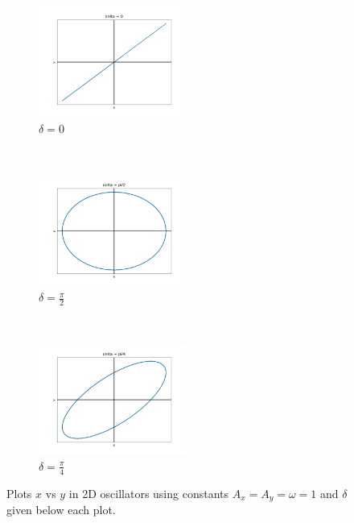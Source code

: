 \begin{figure}[h]
    \centering
    \begin{subfigure}[t]{0.3\textwidth}
        \centering
        \includegraphics[width=4.85cm]{Classical_Mechanics/2.11-2d-osc/Osc2D_delta0.png}
        \caption{$\delta = 0$}
    \end{subfigure}
    ~ 
    \begin{subfigure}[t]{0.3\textwidth}
        \centering
        \includegraphics[width=4.85cm]{Classical_Mechanics/2.11-2d-osc/Osc2D_deltapi2.png}
        \caption{$\delta = \frac{\pi}{2}$}
    \end{subfigure}
    ~
    \begin{subfigure}[t]{0.3\textwidth}
        \centering
        \includegraphics[width=4.85cm]{Classical_Mechanics/2.11-2d-osc/Osc2D_deltapi4.png}
        \caption{$\delta = \frac{\pi}{4}$}
    \end{subfigure}
    \caption{Plots $x$ vs $y$ in 2D oscillators using constants $A_x = A_y = \omega = 1$ and $\delta$ given below each plot.}
    \label{fig:Osc2D_examples}
\end{figure}

